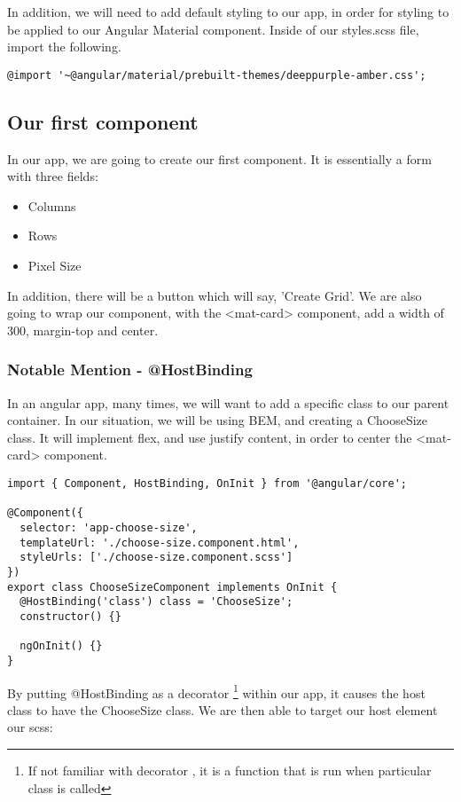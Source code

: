 In addition, we will need to add default styling to our app, in order for
styling to be applied to our Angular Material component. Inside of our
styles.scss file, import the following.
\begin{verbatim}
@import '~@angular/material/prebuilt-themes/deeppurple-amber.css';
\end{verbatim}

\subsection{ Our first component }
In our app, we are going to create our first component. It is essentially a form
with three fields:
\begin{itemize}
  \item Columns
  \item Rows
  \item Pixel Size
\end{itemize}

In addition, there will be a button which will say, 'Create Grid'. We are also
going to wrap our component, with the <mat-card> component, add a width of
300, margin-top and center.

\subsubsection{ Notable Mention - @HostBinding }
In an angular app, many times, we will want to add a specific class to our
parent container. In our situation, we will be using BEM, and creating a
ChooseSize class. It will implement flex, and use justify content, in order to
center the <mat-card> component.

\begin{lstlisting}[caption=My Javascript Example]
import { Component, HostBinding, OnInit } from '@angular/core';

@Component({
  selector: 'app-choose-size',
  templateUrl: './choose-size.component.html',
  styleUrls: ['./choose-size.component.scss']
})
export class ChooseSizeComponent implements OnInit {
  @HostBinding('class') class = 'ChooseSize';
  constructor() {}

  ngOnInit() {}
}
\end{lstlisting}

By putting @HostBinding as a decorator \footnote{If not familiar with decorator
, it is a function that is run when particular class is called} within our app,
it causes the host class to have the ChooseSize class. We are then able to
target our host element our scss:


